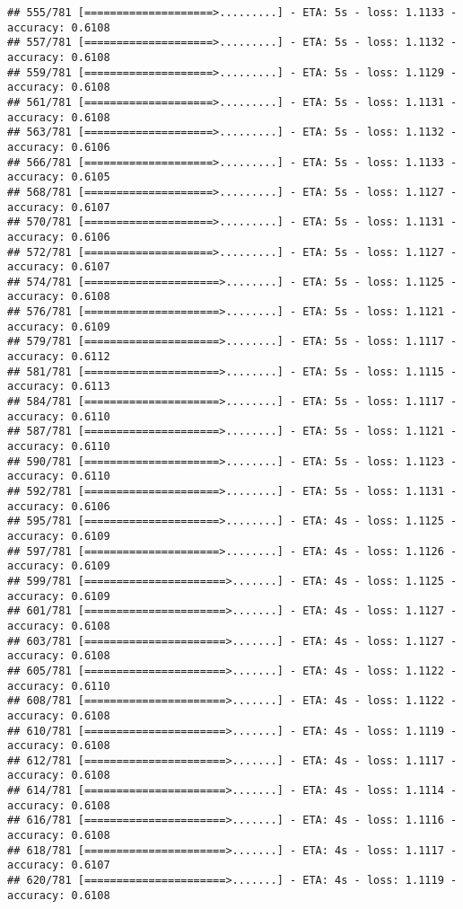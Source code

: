 \documentclass[
]{article}
\begin{document}
\begin{verbatim}
## 555/781 [====================>.........] - ETA: 5s - loss: 1.1133 - accuracy: 0.6108
## 557/781 [====================>.........] - ETA: 5s - loss: 1.1132 - accuracy: 0.6108
## 559/781 [====================>.........] - ETA: 5s - loss: 1.1129 - accuracy: 0.6108
## 561/781 [====================>.........] - ETA: 5s - loss: 1.1131 - accuracy: 0.6108
## 563/781 [====================>.........] - ETA: 5s - loss: 1.1132 - accuracy: 0.6106
## 566/781 [====================>.........] - ETA: 5s - loss: 1.1133 - accuracy: 0.6105
## 568/781 [====================>.........] - ETA: 5s - loss: 1.1127 - accuracy: 0.6107
## 570/781 [====================>.........] - ETA: 5s - loss: 1.1131 - accuracy: 0.6106
## 572/781 [====================>.........] - ETA: 5s - loss: 1.1127 - accuracy: 0.6107
## 574/781 [=====================>........] - ETA: 5s - loss: 1.1125 - accuracy: 0.6108
## 576/781 [=====================>........] - ETA: 5s - loss: 1.1121 - accuracy: 0.6109
## 579/781 [=====================>........] - ETA: 5s - loss: 1.1117 - accuracy: 0.6112
## 581/781 [=====================>........] - ETA: 5s - loss: 1.1115 - accuracy: 0.6113
## 584/781 [=====================>........] - ETA: 5s - loss: 1.1117 - accuracy: 0.6110
## 587/781 [=====================>........] - ETA: 5s - loss: 1.1121 - accuracy: 0.6110
## 590/781 [=====================>........] - ETA: 5s - loss: 1.1123 - accuracy: 0.6110
## 592/781 [=====================>........] - ETA: 5s - loss: 1.1131 - accuracy: 0.6106
## 595/781 [=====================>........] - ETA: 4s - loss: 1.1125 - accuracy: 0.6109
## 597/781 [=====================>........] - ETA: 4s - loss: 1.1126 - accuracy: 0.6109
## 599/781 [======================>.......] - ETA: 4s - loss: 1.1125 - accuracy: 0.6109
## 601/781 [======================>.......] - ETA: 4s - loss: 1.1127 - accuracy: 0.6108
## 603/781 [======================>.......] - ETA: 4s - loss: 1.1127 - accuracy: 0.6108
## 605/781 [======================>.......] - ETA: 4s - loss: 1.1122 - accuracy: 0.6110
## 608/781 [======================>.......] - ETA: 4s - loss: 1.1122 - accuracy: 0.6108
## 610/781 [======================>.......] - ETA: 4s - loss: 1.1119 - accuracy: 0.6108
## 612/781 [======================>.......] - ETA: 4s - loss: 1.1117 - accuracy: 0.6108
## 614/781 [======================>.......] - ETA: 4s - loss: 1.1114 - accuracy: 0.6108
## 616/781 [======================>.......] - ETA: 4s - loss: 1.1116 - accuracy: 0.6108
## 618/781 [======================>.......] - ETA: 4s - loss: 1.1117 - accuracy: 0.6107
## 620/781 [======================>.......] - ETA: 4s - loss: 1.1119 - accuracy: 0.6108

\end{verbatim}
\end{document}
